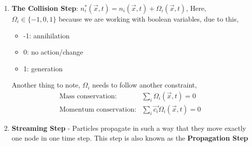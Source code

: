 \documentclass{beamer}
\begin{document}
\begin{frame}
	\begin{enumerate}
	\item \textbf{The Collision Step}: $n_i^*(\vec{x},t) = n_i(\vec{x},t) + \Omega_i(\vec{x},t)$, Here, $\Omega_i \in \{-1,0,1\}$ because we are working with boolean variables, due to this,
		\begin{itemize}
			\item -1: annihilation
			\item 0: no action/change
			\item 1: generation
		\end{itemize}
Another thing to note, $\Omega_i$ needs to follow another constraint, 
\begin{align*}
	\text{Mass conservation}:&\sum_i \Omega_i (\vec{x},t) = 0 \\
	\text{Momentum conservation}:&\sum_i \vec{c_i} \Omega_i(\vec{x},t) = 0
\end{align*}
\item \textbf{Streaming Step} -   Particles propagate in such a way that they move exactly one node in one time step. This step is also known as the \textbf{Propagation Step}
\end{enumerate}
\end{frame}
\end{document}
